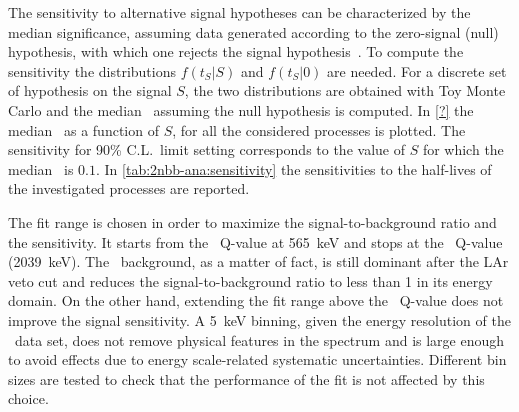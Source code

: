 The sensitivity to alternative signal hypotheses can be characterized by the median
significance, assuming data generated according to the zero-signal (null) hypothesis, with
which one rejects the signal hypothesis~\cite{Cowan2011}. To compute the sensitivity the
distributions $f(t_S|S)$ and $f(t_S|0)$ are needed. For a discrete set of hypothesis on
the signal $S$, the two distributions are obtained with Toy Monte Carlo and the median
\pvalue\ assuming the null hypothesis is computed. In \cref{?} the median \pvalue\ as a
function of $S$, for all the considered processes is plotted. The sensitivity for 90\%
C.L.~limit setting corresponds to the value of $S$ for which the median \pvalue\ is $0.1$.
In \cref{tab:2nbb-ana:sensitivity} the sensitivities to the half-lives of the investigated
processes are reported.

The fit range is chosen in order to maximize the signal-to-background ratio and the
sensitivity. It starts from the \Arl\ Q-value at 565~keV and stops at the \nnbb\ Q-value
(2039~keV). The \Arl\ background, as a matter of fact, is still dominant after the LAr
veto cut and reduces the signal-to-background ratio to less than 1 in its energy domain.
On the other hand, extending the fit range above the \nnbb\ Q-value does not improve the
signal sensitivity.
\newpar
A 5~keV binning, given the energy resolution of the \enrBEGeII\ data set, does not
remove physical features in the spectrum and is large enough to avoid effects due to
energy scale-related systematic uncertainties. Different bin sizes are tested
to check that the performance of the fit is not affected by this choice.

